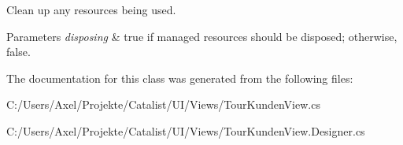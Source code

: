 Clean up any resources being used. 


\begin{DoxyParams}{Parameters}
{\em disposing} & true if managed resources should be disposed; otherwise, false.\\
\hline
\end{DoxyParams}


The documentation for this class was generated from the following files\+:\begin{DoxyCompactItemize}
\item 
C\+:/\+Users/\+Axel/\+Projekte/\+Catalist/\+U\+I/\+Views/Tour\+Kunden\+View.\+cs\item 
C\+:/\+Users/\+Axel/\+Projekte/\+Catalist/\+U\+I/\+Views/Tour\+Kunden\+View.\+Designer.\+cs\end{DoxyCompactItemize}
